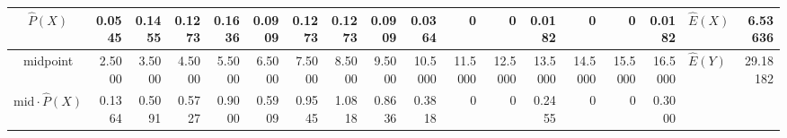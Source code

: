 \begin{table}[ht]
\begin{adjustbox}{width = \textwidth, center}
\begin{tabular}{|c|r|r|r|r|r|r|r|r|r|r|r|r|r|r|r|r|r|}
            \rowcolor[HTML]{D9EAD3} 
            $\widehat{P}(X)$                               & 0.0545                                         & 0.1455                                         & 0.1273                                         & 0.1636                                         & 0.0909                                         & 0.1273                                         & 0.1273                                         & 0.0909                                          & 0.0364                                          & 0                                               & 0                                               & 0.0182                                          & 0                                               & 0                                               & 0.0182                                          & \multicolumn{1}{l|}{\cellcolor[HTML]{FCE5CD}$\widehat{E}(X)$}                   & \cellcolor[HTML]{FCE5CD}6.53636                                                           \\ \hline
            \rowcolor[HTML]{D9EAD3} 
            midpoint                                             & 2.5000                                         & 3.5000                                         & 4.5000                                         & 5.5000                                         & 6.5000                                         & 7.5000                                         & 8.5000                                         & 9.5000                                          & 10.5000                                         & 11.5000                                         & 12.5000                                         & 13.5000                                         & 14.5000                                         & 15.5000                                         & 16.5000                                         & \multicolumn{1}{l|}{\cellcolor[HTML]{FCE5CD}$\widehat{E}(Y)$}                   & \cellcolor[HTML]{FCE5CD}29.18182                                                          \\ \hline
            \cellcolor[HTML]{D9EAD3}$\mathrm{mid}\cdot\widehat{P}(X)$ & \cellcolor[HTML]{D9EAD3}0.1364                 & \cellcolor[HTML]{D9EAD3}0.5091                 & \cellcolor[HTML]{D9EAD3}0.5727                 & \cellcolor[HTML]{D9EAD3}0.9000                 & \cellcolor[HTML]{D9EAD3}0.5909                 & \cellcolor[HTML]{D9EAD3}0.9545                 & \cellcolor[HTML]{D9EAD3}1.0818                 & \cellcolor[HTML]{D9EAD3}0.8636                  & \cellcolor[HTML]{D9EAD3}0.3818                  & \cellcolor[HTML]{D9EAD3}0                       & \cellcolor[HTML]{D9EAD3}0                       & \cellcolor[HTML]{D9EAD3}0.2455                  & \cellcolor[HTML]{D9EAD3}0                       & \cellcolor[HTML]{D9EAD3}0                       & \cellcolor[HTML]{D9EAD3}0.3000                  & \multicolumn{2}{l|}{}                                                                                                                                       \\ \hline

\end{tabular}
\end{adjustbox}
\end{table}
